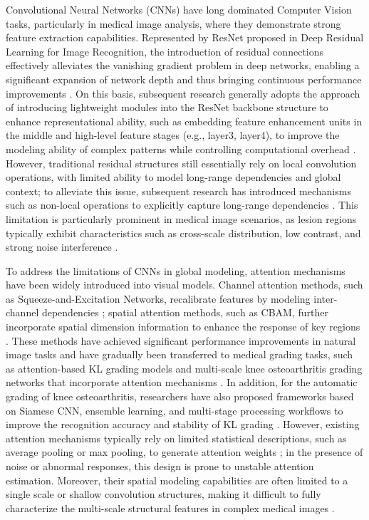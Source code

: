 \documentclass[runningheads]{llncs}
\begin{document}
Convolutional Neural Networks (CNNs) have long dominated Computer Vision tasks, particularly in medical image analysis, where they demonstrate strong feature extraction capabilities\cite{1}. Represented by ResNet proposed in Deep Residual Learning for Image Recognition, the introduction of residual connections effectively alleviates the vanishing gradient problem in deep networks, enabling a significant expansion of network depth and thus bringing continuous performance improvements \cite{4}. On this basis, subsequent research generally adopts the approach of introducing lightweight modules into the ResNet backbone structure to enhance representational ability, such as embedding feature enhancement units in the middle and high-level feature stages (e.g., layer3, layer4), to improve the modeling ability of complex patterns while controlling computational overhead \cite{5,6,7,8,15}. However, traditional residual structures still essentially rely on local convolution operations, with limited ability to model long-range dependencies and global context; to alleviate this issue, subsequent research has introduced mechanisms such as non-local operations to explicitly capture long-range dependencies \cite{16}. This limitation is particularly prominent in medical image scenarios, as lesion regions typically exhibit characteristics such as cross-scale distribution, low contrast, and strong noise interference \cite{1,23,27}.

To address the limitations of CNNs in global modeling, attention mechanisms have been widely introduced into visual models. Channel attention methods, such as Squeeze-and-Excitation Networks, recalibrate features by modeling inter-channel dependencies \cite{5}; spatial attention methods, such as CBAM, further incorporate spatial dimension information to enhance the response of key regions \cite{6}. These methods have achieved significant performance improvements in natural image tasks and have gradually been transferred to medical grading tasks, such as attention-based KL grading models and multi-scale knee osteoarthritis grading networks that incorporate attention mechanisms \cite{7,8}. In addition, for the automatic grading of knee osteoarthritis, researchers have also proposed frameworks based on Siamese CNN, ensemble learning, and multi-stage processing workflows to improve the recognition accuracy and stability of KL grading \cite{18,19,20,21}. However, existing attention mechanisms typically rely on limited statistical descriptions, such as average pooling or max pooling, to generate attention weights \cite{5,6}; in the presence of noise or abnormal responses, this design is prone to unstable attention estimation. Moreover, their spatial modeling capabilities are often limited to a single scale or shallow convolution structures, making it difficult to fully characterize the multi-scale structural features in complex medical images \cite{6,7,8,13,14}.
\end{document}
